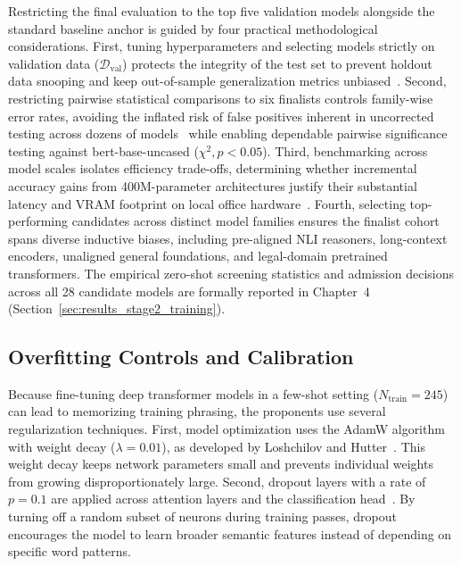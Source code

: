     Restricting the final evaluation to the top five validation models alongside the standard baseline anchor is guided by four practical methodological considerations. First, tuning hyperparameters and selecting models strictly on validation data ($\mathcal{D}_{\text{val}}$) protects the integrity of the test set to prevent holdout data snooping and keep out-of-sample generalization metrics unbiased~\cite{dwork2015reusable}. Second, restricting pairwise statistical comparisons to six finalists controls family-wise error rates, avoiding the inflated risk of false positives inherent in uncorrected testing across dozens of models~\cite{dietterich1998approximate} while enabling dependable pairwise significance testing against bert-base-uncased ($\chi^2, p < 0.05$). Third, benchmarking across model scales isolates efficiency trade-offs, determining whether incremental accuracy gains from 400M-parameter architectures justify their substantial latency and VRAM footprint on local office hardware~\cite{schwartz2020green, strubell2019energy}. Fourth, selecting top-performing candidates across distinct model families ensures the finalist cohort spans diverse inductive biases, including pre-aligned NLI reasoners, long-context encoders, unaligned general foundations, and legal-domain pretrained transformers. The empirical zero-shot screening statistics and admission decisions across all 28 candidate models are formally reported in Chapter~4 (Section~\ref{sec:results_stage2_training}).

    \subsection{Overfitting Controls and Calibration}
    \label{sec:overfitting_controls}
    Because fine-tuning deep transformer models in a few-shot setting ($N_{\text{train}} = 245$) can lead to memorizing training phrasing, the proponents use several regularization techniques. First, model optimization uses the AdamW algorithm with weight decay ($\lambda = 0.01$), as developed by Loshchilov and Hutter~\cite{loshchilov2019decoupled}. This weight decay keeps network parameters small and prevents individual weights from growing disproportionately large. Second, dropout layers with a rate of $p = 0.1$ are applied across attention layers and the classification head~\cite{srivastava2014dropout}. By turning off a random subset of neurons during training passes, dropout encourages the model to learn broader semantic features instead of depending on specific word patterns.

